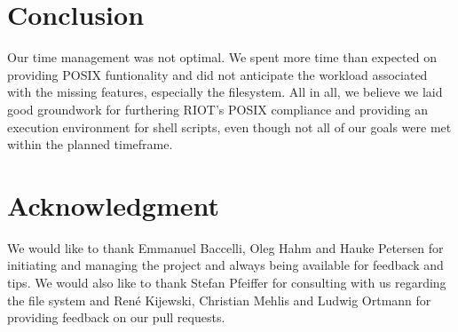 \documentclass[conference]{IEEEtran}
\begin{document}
\section{Conclusion}
\label{sec:Conclusion}
Our time management was not optimal. We spent more time than expected on
providing POSIX funtionality and did not anticipate the workload
associated with the missing features, especially the filesystem. All in
all, we believe we laid good groundwork for furthering RIOT's POSIX
compliance and providing an execution environment for shell scripts,
even though not all of our goals were met within the planned timeframe.

\section*{Acknowledgment}
\label{sec:Acknowledgement}
We would like to thank Emmanuel Baccelli, Oleg Hahm and Hauke Petersen
for initiating and managing the project and always being available for
feedback and tips. We would also like to thank Stefan Pfeiffer for
consulting with us regarding the file system and Ren\'{e} Kijewski,
Christian Mehlis and Ludwig Ortmann for providing feedback on our pull
requests.



\end{document}
